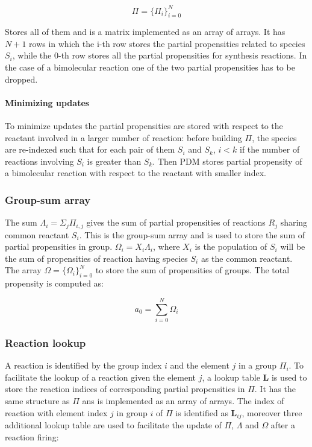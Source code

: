     $$\Pi = \{\Pi_i\}_{i=0}^N$$

    Stores all of them and is a matrix implemented as an array of arrays.
    It has $N+1$ rows in which the i-th row stores the partial propensities related to species $S_i$, while the 0-th row stores all the partial propensities for synthesis reactions.
    In the case of a bimolecular reaction one of the two partial propensities has to be dropped.

      \paragraph{Minimizing updates}
      To minimize updates the partial propensities are stored with respect to the reactant involved in a larger number of reaction: before building $\Pi$, the species are re-indexed such that for each pair of them $S_i$ and $S_k$, $i<k$ if the number of reactions involving $S_i$ is greater than $S_k$.
      Then PDM stores partial propensity of a bimolecular reaction with respect to the reactant with smaller index.

    \subsubsection{Group-sum array}
    The sum $\Lambda_i = \Sigma_j\Pi_{i,j}$ gives the sum of partial propensities of reactions $R_j$ sharing common reactant $S_i$.
    This is the group-sum array and is used to store the sum of partial propensities in group.
    $\Omega_i = X_i\Lambda_i$, where $X_i$ is the population of $S_i$ will be the sum of propensities of reaction having species $S_i$ as the common reactant.
    The array $\Omega = \{\Omega_i\}_{i=0}^N$ to store the sum of propensities of groups.
    The total propensity is computed as:

    $$a_0 = \sum\limits_{i=0}^N\Omega_i$$

    \subsubsection{Reaction lookup}
    A reaction is identified by the group index $i$ and the element $j$ in a group $\Pi_i$.
    To facilitate the lookup of a reaction given the element $j$, a lookup table $\mathbf{L}$ is used to store the reaction indices of corresponding partial propensities in $\Pi$.
    It has the same structure as $\Pi$ ans is implemented as an array of arrays.
    The index of reaction with element index $j$ in group $i$ of $\Pi$ is identified as $\mathbf{L}_{ij}$, moreover three additional lookup table are used to facilitate the update of $\Pi$, $\Lambda$ and $\Omega$ after a reaction firing:


